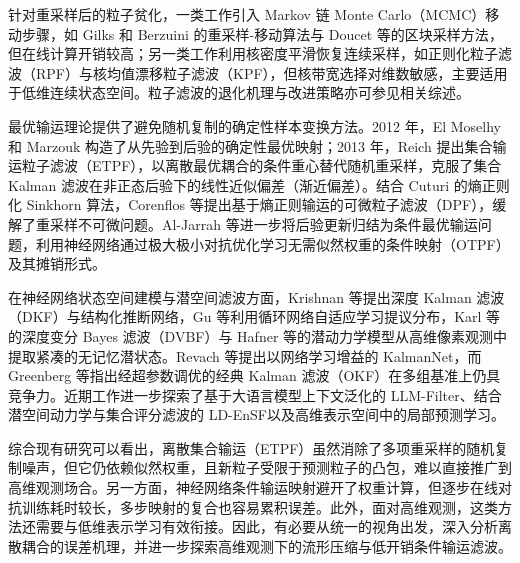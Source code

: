 针对重采样后的粒子贫化，一类工作引入 Markov 链 Monte Carlo（MCMC）移动步骤，如 Gilks 和 Berzuini 的重采样-移动算法\cite{gilks2001following}与 Doucet 等的区块采样方法\cite{doucet2006efficient}，但在线计算开销较高\cite{li2017particle}；另一类工作利用核密度平滑恢复连续采样，如正则化粒子滤波（RPF）\cite{musso2001improving}与核均值漂移粒子滤波（KPF）\cite{chang2005kernel}，但核带宽选择对维数敏感，主要适用于低维连续状态空间。粒子滤波的退化机理与改进策略亦可参见相关综述\cite{li2015particlezh,vanleeuwen2019review}。

最优输运理论提供了避免随机复制的确定性样本变换方法\cite{villani2009optimal,peyre2019computational,ma2019optimaltransportzh}。2012 年，El Moselhy 和 Marzouk 构造了从先验到后验的确定性最优映射\cite{el2012bayesian}；2013 年，Reich 提出集合输运粒子滤波（ETPF）\cite{reich2013nonparametric}，以离散最优耦合的条件重心替代随机重采样，克服了集合 Kalman 滤波\cite{evensen2003ensemble}在非正态后验下的线性近似偏差（渐近偏差）。结合 Cuturi 的熵正则化 Sinkhorn 算法\cite{cuturi2013sinkhorn}，Corenflos 等提出基于熵正则输运的可微粒子滤波（DPF）\cite{corenflos2021differentiable}，缓解了重采样不可微问题。Al-Jarrah 等进一步将后验更新归结为条件最优输运问题，利用神经网络通过极大极小对抗优化学习无需似然权重的条件映射（OTPF）及其摊销形式\cite{aljarrah2023otpf,aljarrah2024brenier,aljarrah2025aotf}。

在神经网络状态空间建模与潜空间滤波方面，Krishnan 等提出深度 Kalman 滤波（DKF）与结构化推断网络\cite{krishnan2015deep,krishnan2017structured}，Gu 等利用循环网络自适应学习提议分布\cite{gu2015neural}，Karl 等的深度变分 Bayes 滤波（DVBF）\cite{karl2016deep}与 Hafner 等的潜动力学模型\cite{hafner2019learning}从高维像素观测中提取紧凑的无记忆潜状态。Revach 等提出以网络学习增益的 KalmanNet\cite{revach2022kalmannet}，而 Greenberg 等指出经超参数调优的经典 Kalman 滤波（OKF）在多组基准上仍具竞争力\cite{greenberg2023optimization}。近期工作进一步探索了基于大语言模型上下文泛化的 LLM-Filter\cite{liu2025onefilterall}、结合潜空间动力学与集合评分滤波的 LD-EnSF\cite{xiao2026ldensf}以及高维表示空间中的局部预测学习\cite{stockl2024localprediction}。

综合现有研究可以看出，离散集合输运（ETPF）虽然消除了多项重采样的随机复制噪声，但它仍依赖似然权重，且新粒子受限于预测粒子的凸包，难以直接推广到高维观测场合。另一方面，神经网络条件输运映射避开了权重计算，但逐步在线对抗训练耗时较长，多步映射的复合也容易累积误差。此外，面对高维观测，这类方法还需要与低维表示学习有效衔接。因此，有必要从统一的视角出发，深入分析离散耦合的误差机理，并进一步探索高维观测下的流形压缩与低开销条件输运滤波。

